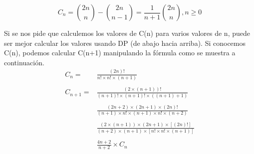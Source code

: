 $$ C_n = \binom{2n}{n} - \binom{2n}{n-1} = \frac{1}{n + 1} \binom{2n}{n} , {n} \geq 0 $$

Si se nos pide que calculemos los valores de C(n) para varios valores de n, puede ser mejor calcular los valores usando DP (de abajo hacia arriba). Si conocemos C(n), podemos calcular C(n+1) manipulando la fórmula como se muestra a continuación.
$$\begin{array}{rl}
C_n =	& \frac{(2n)!}{n!\times n! \times (n+1)} \\
	&  \\
C_{n+1} = 	& \frac{(2\times(n+1))!}{(n+1)!\times(n+1)!\times((n+1)+1)}  \\
	&  \\
	&   \frac{(2n+2)\times(2n+1)\times(2n)!}{(n+1)\times n!\times(n+1)\times n!\times(n+2)} \\
	&  \\
	& \frac{(2\times(n+1))\times(2n+1)\times[(2n)!]}{(n+2)\times(n+1)\times[n!\times n!\times(n+1)]}  \\
	&  \\
	& \frac{4n+2}{n+2} \times C_n
\end{array}$$




